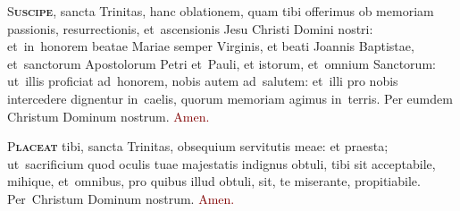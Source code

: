 \documentclass[12pt, landscape]{scrartcl}
\newcommand{\amen}{\textcolor{Maroon}{Amen.}}
\newcommand{\initial}[2]{\lettrine[lines=3]{\color{Maroon}#1}{\bfseries\color{Maroon}#2}}
\newcommand{\gap}{\vspace{0.65cm}}
\begin{document}
\begin{center}
\begin{minipage}[t]{0.29\linewidth}
        \gap

        \initial{S}{uscipe}, sancta Trinitas, hanc oblationem, quam tibi
        offerimus ob memoriam passionis, resurrectionis, et~ascensionis Jesu
        Christi Domini nostri: et~in~honorem beatae Mariae semper Virginis, et
        beati Joannis Baptistae, et~sanctorum Apostolorum Petri et~Pauli, et
        istorum, et~omnium Sanctorum: ut~illis proficiat ad~honorem, nobis autem
        ad~salutem: et~illi pro nobis intercedere dignentur in~caelis, quorum
        memoriam agimus in~terris. Per eumdem Christum Dominum nostrum. \amen

        \gap

        \initial{P}{laceat} tibi, sancta Trinitas, obsequium servitutis meae: et
        praesta; ut~sacrificium quod oculis tuae majestatis indignus obtuli,
        tibi sit acceptabile, mihique, et~omnibus, pro quibus illud obtuli, sit,
        te miserante, propitiabile. Per~Christum Dominum nostrum. \amen

    \end{minipage}
\end{center}

\end{document}
